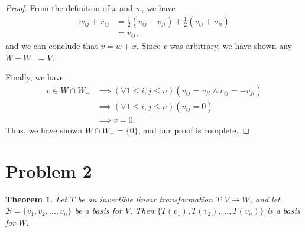 \documentclass[10pt,a4paper]{article}
\newtheorem{theorem}{Theorem}
\theoremstyle{definition}
\begin{document}
\begin{proof}
From the definition of $x$ and $w$, we have 
\begin{align*}
w_{ij} + x_{ij} &= \frac{1}{2}(v_{ij} - v_{ji}) + \frac{1}{2}(v_{ij} + v_{ji})\\
&= v_{ij},
\end{align*}
and we can conclude that $v = w + x$. Since $v$ was arbitrary, we have shown any $W + W_- = V$.

Finally, we have
\begin{align*}
v \in W \cap W_- &\implies (\forall 1 \leq i, j \leq n)(v_{ij} = v_{ji} \land v_{ij} = -v_{ji})\\
&\implies (\forall 1 \leq i, j \leq n)(v_{ij} = 0)\\
&\implies v = 0.
\end{align*}
Thus, we have shown $W \cap W_- = \{0\}$, and our proof is complete.
\end{proof}

\section*{Problem 2}
\begin{theorem}
Let $T$ be an invertible linear transformation $T:V \to W$, and let $\mathcal{B} = \{v_1, v_2, ..., v_n \}$ be a basis for $V$. Then $\{T(v_1), T(v_2),..., T(v_n) \}$ is a basis for $W$.  
\end{theorem}
\end{document}
